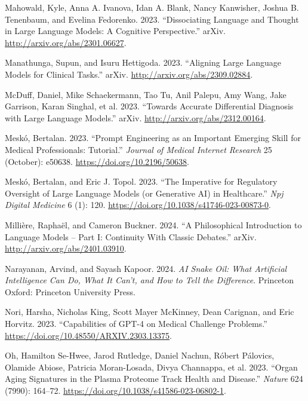 \documentclass[
  Letterpaper,
]{scrbook}
\newlength{\cslhangindent}
\newenvironment{CSLReferences}[2] %
 {\begin{list}{}{%
  \setlength{\itemindent}{0pt}
  \setlength{\leftmargin}{0pt}
  \setlength{\parsep}{0pt}
  \ifodd #1
   \setlength{\leftmargin}{\cslhangindent}
   \setlength{\itemindent}{-1\cslhangindent}
  \fi
  \setlength{\itemsep}{#2\baselineskip}}}
 {\end{list}}
\begin{document}
\begin{CSLReferences}{1}{0}
Mahowald, Kyle, Anna A. Ivanova, Idan A. Blank, Nancy Kanwisher, Joshua
B. Tenenbaum, and Evelina Fedorenko. 2023. {``Dissociating Language and
Thought in Large Language Models: A Cognitive Perspective.''} arXiv.
\url{http://arxiv.org/abs/2301.06627}.

Manathunga, Supun, and Isuru Hettigoda. 2023. {``Aligning {Large}
{Language} {Models} for {Clinical} {Tasks}.''} arXiv.
\url{http://arxiv.org/abs/2309.02884}.

McDuff, Daniel, Mike Schaekermann, Tao Tu, Anil Palepu, Amy Wang, Jake
Garrison, Karan Singhal, et al. 2023. {``Towards {Accurate}
{Differential} {Diagnosis} with {Large} {Language} {Models}.''} arXiv.
\url{http://arxiv.org/abs/2312.00164}.

Meskó, Bertalan. 2023. {``Prompt {Engineering} as an {Important}
{Emerging} {Skill} for {Medical} {Professionals}: {Tutorial}.''}
\emph{Journal of Medical Internet Research} 25 (October): e50638.
\url{https://doi.org/10.2196/50638}.

Meskó, Bertalan, and Eric J. Topol. 2023. {``The Imperative for
Regulatory Oversight of Large Language Models (or Generative {AI}) in
Healthcare.''} \emph{Npj Digital Medicine} 6 (1): 120.
\url{https://doi.org/10.1038/s41746-023-00873-0}.

Millière, Raphaël, and Cameron Buckner. 2024. {``A {Philosophical}
{Introduction} to {Language} {Models} -- {Part} {I}: {Continuity} {With}
{Classic} {Debates}.''} arXiv. \url{http://arxiv.org/abs/2401.03910}.

Narayanan, Arvind, and Sayash Kapoor. 2024. \emph{{AI} Snake Oil: What
Artificial Intelligence Can Do, What It Can't, and How to Tell the
Difference}. Princeton Oxford: Princeton University Press.

Nori, Harsha, Nicholas King, Scott Mayer McKinney, Dean Carignan, and
Eric Horvitz. 2023. {``Capabilities of {GPT}-4 on {Medical} {Challenge}
{Problems}.''} \url{https://doi.org/10.48550/ARXIV.2303.13375}.

Oh, Hamilton Se-Hwee, Jarod Rutledge, Daniel Nachun, Róbert Pálovics,
Olamide Abiose, Patricia Moran-Losada, Divya Channappa, et al. 2023.
{``Organ Aging Signatures in the Plasma Proteome Track Health and
Disease.''} \emph{Nature} 624 (7990): 164--72.
\url{https://doi.org/10.1038/s41586-023-06802-1}.


\end{CSLReferences}
\end{document}
